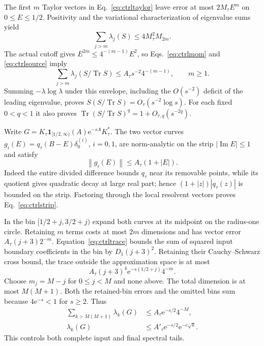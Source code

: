 \documentclass[aps,pra,reprint,superscriptaddress,longbibliography]{revtex4-2}
\newcommand{\Tr}{\operatorname{Tr}}
\newcommand{\ee}{\mathrm e}
\newcommand{\norm}[1]{\left\lVert#1\right\rVert}
\newcommand{\one}{\mathbf 1}
\begin{document}
The first $m$ Taylor vectors in Eq.~\eqref{eq:ctrltaylor} leave
error at most $2M_\tau E^m$ on $0\le E\le1/2$. Positivity and
the variational characterization of eigenvalue sums yield
\begin{equation}
 \sum_{j>m}\lambda_j(S)\le4M_\tau^2M_{2m}.               \label{eq:ctrllowtail}
\end{equation}
The actual cutoff gives $E^{2m}\le4^{-(m-1)}E^2$, so
Eqs.~\eqref{eq:ctrlmom} and \eqref{eq:ctrlsource} imply
\begin{equation}
 \sum_{j>m}\lambda_j(S/\Tr S)
 \le A_\tau s^{-2}4^{-(m-1)},\qquad m\ge1.               \label{eq:ctrllowgeo}
\end{equation}
Summing $-\lambda\log\lambda$ under this envelope, including the
$O(s^{-2})$ deficit of the leading eigenvalue, proves
$S(S/\Tr S)=O_\tau(s^{-2}\log s)$. For each fixed $0<q<1$ it
also proves $\Tr(S/\Tr S)^q=1+O_{\tau,q}(s^{-2q})$.

Write $G=K_\tau\one_{[1/2,\infty)}(A)\ee^{-sA}K_\tau^*$.
The two vector curves
$g_i(E)=q_\tau(B-E)\delta_0^{(i)}$, $i=0,1$, are norm-analytic
on the strip $|\operatorname{Im}E|\le1$ and satisfy
\begin{equation}
 \norm{g_i(E)}\le A_\tau(1+|E|).                         \label{eq:ctrlstrip}
\end{equation}
Indeed the entire divided difference bounds $q_\tau$ near its
removable points, while its quotient gives quadratic decay at large
real part; hence $(1+|z|)|q_\tau(z)|$ is bounded on the strip.
Factoring through the local resolvent vectors proves
Eq.~\eqref{eq:ctrlstrip}.

In the bin $[1/2+j,3/2+j)$ expand both curves at its midpoint on
the radius-one circle. Retaining $m$ terms costs at most $2m$
dimensions and has vector error $A_\tau(j+3)2^{-m}$.
Equation~\eqref{eq:ctrltrace} bounds the sum of squared input
boundary coefficients in the bin by $D_1(j+3)^2$. Retaining their
Cauchy--Schwarz cross bound, the trace outside the approximation
space is at most
\begin{equation}
 A_\tau(j+3)^4\ee^{-s(1/2+j)}4^{-m}.                    \label{eq:ctrlbin}
\end{equation}
Choose $m_j=M-j$ for $0\le j<M$ and none above. The total
dimension is at most $M(M+1)$. Both the retained-bin errors and
the omitted bins sum because $4\ee^{-s}<1$ for $s\ge2$.
Thus
\begin{align}
 \sum_{k>M(M+1)}\lambda_k(G)&\le A_\tau\ee^{-s/2}4^{-M},\nonumber\\
 \lambda_k(G)&\le A'_\tau\ee^{-s/2}\ee^{-c\sqrt k}.
                                                        \label{eq:ctrlhightail}
\end{align}
This controls both complete input and final spectral tails.
\end{document}
